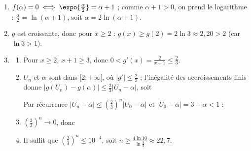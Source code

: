 \begin{description}
\begin{enumerate}
		\item {}
			$f(\alpha) = 0 \iff \expo{\frac{\alpha}{2}} = \alpha + 1$ ; comme $\alpha + 1 > 0$, on prend le logarithme : $\frac{\alpha}{2} = \ln(\alpha + 1)$, soit $\alpha = 2\ln(\alpha+1)$.
			\par\noindent{}
		\item \vln{$g([2;+\infty[) \subset ]2;+\infty[$ :}
			$g$ est croissante, donc pour $x \geq 2$ : $g(x) \geq g(2) = 2\ln 3 \approx 2{,}20 > 2$ (car $\ln 3 > 1$).
			\par\noindent{}
		\item
		\begin{enumerate}
			\item {}
				Pour $x \geq 2$, $x + 1 \geq 3$, donc $0 < g'(x) = \frac{2}{x+1} \leq \frac{2}{3}$.
				\par\noindent{}
			\item {}
				$U_n$ et $\alpha$ sont dans $[2;+\infty[$, où $|g'| \leq \frac{2}{3}$ ; l'inégalité des accroissements finis donne
				$|g(U_n) - g(\alpha)| \leq \frac{2}{3}|U_n - \alpha|$, soit
				\par\noindent{}
				Par récurrence $|U_n - \alpha| \leq \left(\frac{2}{3}\right)^n|U_0 - \alpha|$ et $|U_0 - \alpha| = 3 - \alpha < 1$ :
				\par\noindent{}
			\item {}
				$\left(\frac{2}{3}\right)^n \to 0$, donc \par\noindent{}
			\item {}
				Il suffit que $\left(\frac{2}{3}\right)^n \leq 10^{-4}$, soit $n \geq \frac{4\ln 10}{\ln\frac{3}{2}} \approx 22{,}7$.
				\par\noindent{}
		\end{enumerate}
	\end{enumerate}
\end{description}
